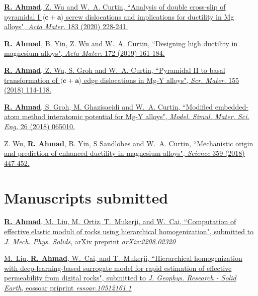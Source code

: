 \documentclass[margin,line]{resume}
\begin{document}
\begin{resume}
    \href{https://www.sciencedirect.com/science/article/pii/S1359645419307256} {\textbf{R. Ahmad}, Z. Wu and W.~A.
        Curtin, ``Analysis of double cross-slip of pyramidal I $\langle \boldsymbol{c} + \boldsymbol{a} \rangle$ screw dislocations and implications for ductility in Mg alloys", \textit{Acta Mater.} 183 (2020) 228-241.}

    \href{https://www.sciencedirect.com/science/article/pii/S1359645419302198} {\textbf{R. Ahmad}, B. Yin, Z. Wu and W.~A. Curtin, ``Designing high ductility in magnesium alloys", \textit{Acta Mater.} 172 (2019) 161-184.}

    \href{https://www.sciencedirect.com/science/article/pii/S1359646218303804}{\textbf{R. Ahmad}, Z. Wu, S. Groh and W.~A. Curtin, ``Pyramidal II to basal transformation of $\langle \boldsymbol{c} + \boldsymbol{a} \rangle$ edge dislocations in Mg-Y alloys", \textit{Scr. Mater.} 155 (2018) 114-118.}

    \href{https://iopscience.iop.org/article/10.1088/1361-651X/aacfd2}{\textbf{R. Ahmad}, S. Groh, M. Ghazisaeidi and W.~A. Curtin, ``Modified embedded-atom method interatomic potential for Mg-Y alloys", \textit{Model. Simul. Mater. Sci. Eng.} 26 (2018) 065010.}

    \href{https://science.sciencemag.org/content/359/6374/447.full} {Z. Wu, \textbf{R. Ahmad}, B. Yin, S Sandlöbes and W.~A. Curtin, ``Mechanistic origin and prediction of enhanced ductility in magnesium alloys", \textit{Science} 359 (2018) 447-452.}


    \section{\mysidestyle Manuscripts submitted}

    \href{https://arxiv.org/pdf/2208.02320.pdf} {\textbf{R. Ahmad}, M.~Liu, M.~Ortiz, T.~Mukerji, and W.~Cai, ``Computation of effective elastic moduli of rocks using hierarchical homogenization", submitted to \textit{J. Mech. Phys. Solids}, arXiv preprint \textit{arXiv:2208.02320}}

    \href{https://www.essoar.org/pdfjs/10.1002/essoar.10512161.1} {M.~Liu, \textbf{R. Ahmad}, W.~Cai, and T.~Mukerji, ``Hierarchical homogenization with deep-learning-based surrogate model for rapid estimation of effective permeability from digital rocks", submitted to \textit{J. Geophys. Research - Solid Earth}, eossoar priprint \textit{essoar.10512161.1}}




\end{resume}
\end{document}
